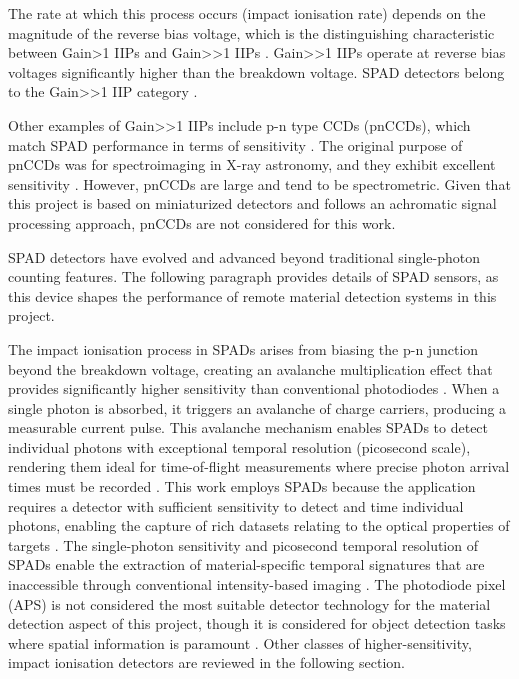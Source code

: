 \documentclass[12pt,a4paper,oneside]{report}
\begin{document}
The rate at which this process occurs (impact ionisation rate) depends on the magnitude of the reverse bias voltage, which is the distinguishing characteristic between Gain>1 IIPs and Gain>>1 IIPs \cite{bass2010}. Gain>>1 IIPs operate at reverse bias voltages significantly higher than the breakdown voltage. SPAD detectors belong to the Gain>>1 IIP category \cite{piron2020}.

Other examples of Gain>>1 IIPs include p-n type CCDs (pnCCDs), which match SPAD performance in terms of sensitivity \cite{bass2010}. The original purpose of pnCCDs was for spectroimaging in X-ray astronomy, and they exhibit excellent sensitivity \cite{bass2010}. However, pnCCDs are large and tend to be spectrometric. Given that this project is based on miniaturized detectors and follows an achromatic signal processing approach, pnCCDs are not considered for this work.

SPAD detectors have evolved and advanced beyond traditional single-photon counting features. The following paragraph provides details of SPAD sensors, as this device shapes the performance of remote material detection systems in this project.

The impact ionisation process in SPADs arises from biasing the p-n junction beyond the breakdown voltage, creating an avalanche multiplication effect that provides significantly higher sensitivity than conventional photodiodes \cite{piron2020}. When a single photon is absorbed, it triggers an avalanche of charge carriers, producing a measurable current pulse. This avalanche mechanism enables SPADs to detect individual photons with exceptional temporal resolution (picosecond scale), rendering them ideal for time-of-flight measurements where precise photon arrival times must be recorded \cite{piron2020,gyongy2022}. This work employs SPADs because the application requires a detector with sufficient sensitivity to detect and time individual photons, enabling the capture of rich datasets relating to the optical properties of targets \cite{su2016,becker2023}. The single-photon sensitivity and picosecond temporal resolution of SPADs enable the extraction of material-specific temporal signatures that are inaccessible through conventional intensity-based imaging \cite{su2016,becker2023,tafone2023}. The photodiode pixel (APS) is not considered the most suitable detector technology for the material detection aspect of this project, though it is considered for object detection tasks where spatial information is paramount \cite{bass2010}. Other classes of higher-sensitivity, impact ionisation detectors are reviewed in the following section.
\end{document}
